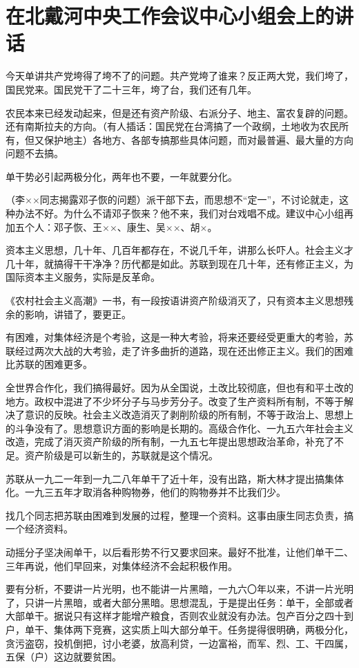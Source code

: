 \section[在北戴河中央工作会议中心小组会上的讲话（一九六二年八月九日）]{在北戴河中央工作会议中心小组会上的讲话}


今天单讲共产党垮得了垮不了的问题。共产党垮了谁来？反正两大党，我们垮了，国民党来。国民党干了二十三年，垮了台，我们还有几年。

农民本来已经发动起来，但是还有资产阶级、右派分子、地主、富农复辟的问题。还有南斯拉夫的方向。（有人插话：国民党在台湾搞了一个政纲，土地收为农民所有，但又保护地主）各地方、各部专搞那些具体问题，而对最普遍、最大量的方向问题不去搞。

单干势必引起两极分化，两年也不要，一年就要分化。

（李××同志揭露邓子恢的问题）派干部下去，而思想不“定一”，不讨论就走，这种办法不好。为什么不请邓子恢来？他不来，我们对台戏唱不成。建议中心小组再加五个人：邓子恢、王××、康生、吴××、胡×。

资本主义思想，几十年、几百年都存在，不说几千年，讲那么长吓人。社会主义才几十年，就搞得干干净净？历代都是如此。苏联到现在几十年，还有修正主义，为国际资本主义服务，实际是反革命。

《农村社会主义高潮》一书，有一段按语讲资产阶级消灭了，只有资本主义思想残余的影响，讲错了，要更正。

有困难，对集体经济是个考验，这是一种大考验，将来还要经受更重大的考验，苏联经过两次大战的大考验，走了许多曲折的道路，现在还出修正主义。我们的困难比苏联的困难更多。

全世界合作化，我们搞得最好。因为从全国说，土改比较彻底，但也有和平土改的地方。政权中混进了不少坏分子与马步芳分子。改变了生产资料所有制，不等于解决了意识的反映。社会主义改造消灭了剥削阶级的所有制，不等于政治上、思想上的斗争没有了。思想意识方面的影响是长期的。高级合作化、一九五六年社会主义改造，完成了消灭资产阶级的所有制，一九五七年提出思想政治革命，补充了不足。资产阶级是可以新生的，苏联就是这个情况。

苏联从一九二一年到一九二八年单干了近十年，没有出路，斯大林才提出搞集体化。一九三五年才取消各种购物券，他们的购物券并不比我们少。

找几个同志把苏联由困难到发展的过程，整理一个资料。这事由康生同志负责，搞一个经济资料。

动摇分子坚决闹单干，以后看形势不行又要求回来。最好不批准，让他们单干二、三年再说，他们早回来，对集体经济不会起积极作用。

要有分析，不要讲一片光明，也不能讲一片黑暗，一九六〇年以来，不讲一片光明了，只讲一片黑暗，或者大部分黑暗。思想混乱，于是提出任务：单干，全部或者大部单干。据说只有这样才能增产粮食，否则农业就没有办法。包产百分之四十到户，单干、集体两下竞赛，这实质上叫大部分单干。任务提得很明确，两极分化，贪污盗窃，投机倒把，讨小老婆，放高利贷，一边富裕，而军、烈、工、干四属，五保（户）这边就要贫困。

